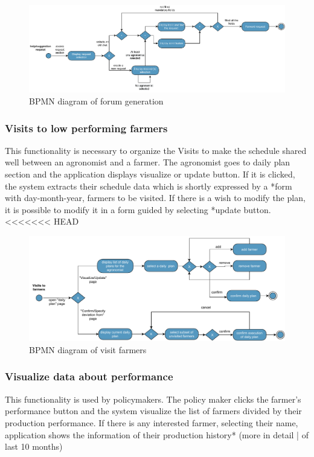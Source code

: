 \begin{figure}[H]
	\centering
    \includegraphics[width=\textwidth]{Images/BPMN/help-suggestion-request.pdf}
	\caption{\label{fig:bpmn_forum_generation}BPMN diagram of forum generation}
\end{figure}


\subsubsection{Visits to low performing farmers}
This functionality is necessary to organize the Visits to make the schedule shared well 
between an agronomist and a farmer. The agronomist goes to daily plan section and the 
application displays visualize or update button. If it is clicked, the system extracts their schedule
data which is shortly expressed by a *form with day-month-year, farmers to be visited.
If there is a wish to modify the plan, it is possible to modify it in a form guided by selecting 
*update button.
<<<<<<< HEAD

\begin{figure}[H]
	\centering
    \includegraphics[width=\textwidth]{Images/BPMN/visit.pdf}
	\caption{\label{fig:bpmn_visit}BPMN diagram of visit farmers}
\end{figure}


\subsubsection{Visualize data about performance}
This functionality is used by policymakers. The policy maker clicks the farmer's performance button and the system visualize the list of farmers divided by their production performance. If there is any interested farmer, selecting their name, application shows the information of their production history* (more in detail | of last 10 months) 

